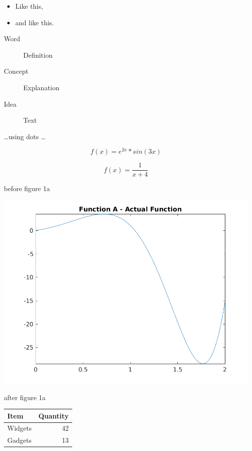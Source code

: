 \documentclass[a4paper]{article}
\begin{document}
\begin{itemize}
\item Like this,
\item and like this.
\end{itemize}

\begin{description}
\item[Word] Definition
\item[Concept] Explanation
\item[Idea] Text
\end{description}

\dots using dots \dots


\begin{equation}
f(x) = e^{2x} * sin(3x)
\label{eq:fa}
\end{equation}

\begin{equation}
f(x) = \frac{1}{x+4}
\label{eq:fb}
\end{equation}



before figure 1a
\begin{center}
	\includegraphics[width=1\textwidth]{../output/a_actual.png}
	\label{figa}
\end{center}
after figure 1a



\bgroup
\def\arraystretch{1.5}
\begin{center}
	\centering
	\begin{tabular}{l|r}
	\textbf{Item} & \textbf{Quantity} \\
	\hline
	Widgets & 42 \\
	Gadgets & 13
	\end{tabular}
	\label{table1}
\end{center}
\egroup
\end{document}
